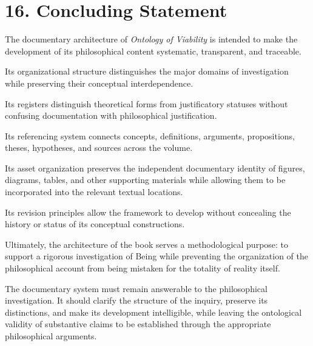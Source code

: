 \section*{16. Concluding Statement}

The documentary architecture of
\textit{Ontology of Viability} is intended
to make the development of its philosophical
content systematic, transparent, and traceable.

Its organizational structure distinguishes
the major domains of investigation while
preserving their conceptual interdependence.

Its registers distinguish theoretical forms
from justificatory statuses without confusing
documentation with philosophical justification.

Its referencing system connects concepts,
definitions, arguments, propositions, theses,
hypotheses, and sources across the volume.

Its asset organization preserves the independent
documentary identity of figures, diagrams,
tables, and other supporting materials while
allowing them to be incorporated into the
relevant textual locations.

Its revision principles allow the framework
to develop without concealing the history
or status of its conceptual constructions.

Ultimately, the architecture of the book
serves a methodological purpose: to support
a rigorous investigation of Being while
preventing the organization of the philosophical
account from being mistaken for the totality
of reality itself.

The documentary system must remain answerable
to the philosophical investigation. It should
clarify the structure of the inquiry, preserve
its distinctions, and make its development
intelligible, while leaving the ontological
validity of substantive claims to be established
through the appropriate philosophical arguments.

\cleardoublepage

